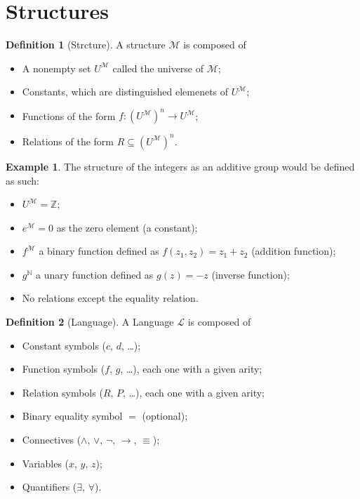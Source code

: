 \documentclass[11pt,a4paper]{article}
\theoremstyle{definition}
\newtheorem{definition}{Definition}[section]
\newtheorem{example}{Example}[section]
\theoremstyle{plain}
\newcommand{\N}{\mathbb{N}}
\newcommand{\Z}{\mathbb{Z}}
\newcommand{\M}{\mathcal{M}}
\renewcommand{\L}{\mathcal{L}}
\renewcommand{\implies}{\rightarrow}
\begin{document}
  \section{Structures}
  \begin{definition}[Strcture]
    A structure $\M$ is composed of
    \begin{itemize}
      \item A nonempty set $U^\M$ called the universe of $\M$;
      \item Constants, which are distinguished elemenets of $U^\M$;
      \item Functions of the form $f \colon (U^\M)^n \to U^\M$;
      \item Relations of the form $R \subseteq (U^\M)^n$.
    \end{itemize}
  \end{definition}

  \begin{example}\label{example:group-structure}
    The structure of the integers as an additive group would be defined
    as such:
    \begin{itemize}
      \item $U^\M = \Z$;
      \item $e^\M = 0$ as the zero element (a constant);
      \item $f^\M$ a binary function defined as $f(z_1,z_2) = z_1 + z_2$ 
        (addition function);
      \item $g^\N$ a unary function defined as $g(z) = -z$ (inverse function);
      \item No relations except the equality relation.
    \end{itemize}
  \end{example}

  \begin{definition}[Language]
    A Language $\L$ is composed of
    \begin{itemize}
      \item Constant symbols ($c$, $d$, \dots);
      \item Function symbols ($f$, $g$, \dots), each one with a given arity;
      \item Relation symbols ($R$, $P$, \dots), each one with a given arity;
      \item Binary equality symbol $=$ (optional);
      \item Connectives ($\land$, $\lor$, $\neg$, $\implies$, $\equiv$);
      \item Variables ($x$, $y$, $z$);
      \item Quantifiers ($\exists$, $\forall$).
    \end{itemize}
  \end{definition}
\end{document}
